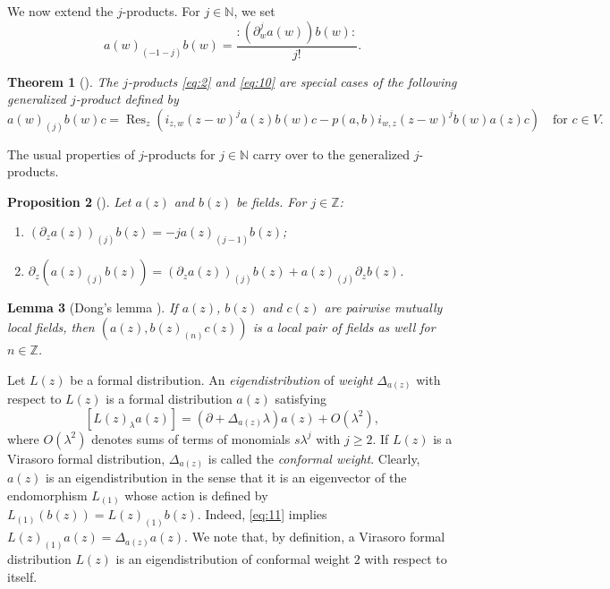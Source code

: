 \documentclass[a4paper, 12pt, reqno]{amsart}
\newtheorem{theorem}{Theorem}[section]
\newtheorem{lemma}[theorem]{Lemma}
\newtheorem{proposition}[theorem]{Proposition}
\theoremstyle{remark}
\numberwithin{equation}{subsection}
\DeclareMathOperator{\Res}{Res}
\begin{document}
We now extend the $j$-products.
For $j \in \mathbb{N}$, we set
\begin{equation}
  \label{eq:10}
  a(w)_{(-1 - j)}b(w) = \frac{:(\partial^j_wa(w))b(w):}{j!}.
\end{equation}

\begin{theorem}[{\cite[Proposition 3.4.3]{nozaradan_introduction_2008}}]
  \label{thr:12}
  The $j$-products \eqref{eq:2} and \eqref{eq:10} are special cases of the following generalized $j$-product defined by
  \begin{equation*}
    a(w)_{(j)}b(w)c = \Res_z(i_{z, w}(z - w)^ja(z)b(w)c - p(a, b)i_{w, z}(z - w)^jb(w)a(z)c) \quad \text{for }c \in V.
  \end{equation*}
\end{theorem}

The usual properties of $j$-products for $j \in \mathbb{N}$ carry over to the generalized $j$-products.

\begin{proposition}[{\cite[Proposition 3.4.4]{nozaradan_introduction_2008}}]
  \label{prp:7}
  Let $a(z)$ and $b(z)$ be fields.
  For $j \in \mathbb{Z}$:
  \begin{enumerate}
  \item $(\partial_za(z))_{(j)}b(z) = -ja(z)_{(j - 1)}b(z)$;
  \item $\partial_z(a(z)_{(j)}b(z)) = (\partial_za(z))_{(j)}b(z) + a(z)_{(j)}\partial_zb(z)$.
  \end{enumerate}
\end{proposition}

\begin{lemma}[Dong's lemma {\cite[Lemma 3.2]{kac_vertex_1998}}]
  \label{lmm:4}
  If $a(z)$, $b(z)$ and $c(z)$ are pairwise mutually local fields, then $(a(z), b(z)_{(n)}c(z))$ is a local pair of fields as well for $n \in \mathbb{Z}$.
\end{lemma}

Let $L(z)$ be a formal distribution.
An \emph{eigendistribution} of \emph{weight} $\Delta_{a(z)}$ with respect to $L(z)$ is a formal distribution $a(z)$ satisfying
\begin{equation}
  \label{eq:11}
  [L(z)_{\lambda}a(z)] = (\partial + \Delta_{a(z)}\lambda)a(z) + O(\lambda^2),
\end{equation}
where $O(\lambda^2)$ denotes sums of terms of monomials $s\lambda^j$ with $j \ge 2$.
If $L(z)$ is a Virasoro formal distribution, $\Delta_{a(z)}$ is called the \emph{conformal weight}.
Clearly, $a(z)$ is an eigendistribution in the sense that it is an eigenvector of the endomorphism $L_{(1)}$ whose action is defined by $L_{(1)}(b(z)) = L(z)_{(1)}b(z)$.
Indeed, \eqref{eq:11} implies $L(z)_{(1)}a(z) = \Delta_{a(z)}a(z)$.
We note that, by definition, a Virasoro formal distribution $L(z)$ is an eigendistribution of conformal weight $2$ with respect to itself.
\end{document}
